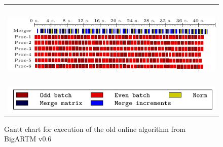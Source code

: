 \documentclass[russian,english]{llncs}
\newcommand{\kw}[1]{\textsf{#1}}
\begin{document}
\begin{figure}[h]
	\centering
	\begin{tabular}{c}
		\includegraphics[height=4cm, width=12cm]{plots/plot_nytimes_model_v06_300.pdf} \\
		\includegraphics[scale=1]{plots/plot_legend_model_v06.pdf}
	\end{tabular}
	\caption{Gantt chart for execution of the old online algorithm from BigARTM \kw{v0.6}} \label{fig:gantt:oldonline}
\end{figure}
\end{document}
